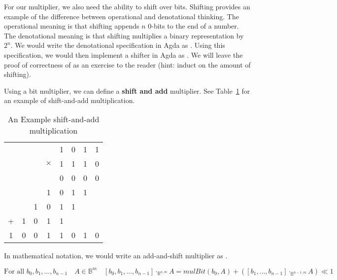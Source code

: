 \documentclass[14pt]{extarticle}  %
\begin{document}
For our multiplier, we also need the ability to shift over bits. Shifting provides an example of the difference between operational and
denotational thinking. The operational meaning is that shifting appends $n$ $0$-bits to the end of a number. The denotational meaning is that
shifting multiplies a binary representation by $2^{n}$. We would write the denotational specification in Agda as .
Using this specification, we would then implement a shifter in Agda as .
We will leave the proof of correctness of  as an exercise to the reader (hint: induct on the amount of shifting).

Using a bit multiplier, we can define a \textbf{shift and add} multiplier. See
Table~\ref{tab:mul} for an example of shift-and-add multiplication.

\begin{table}[!h]
  \begin{tabular}{c|c|c|c|c|c|c|c}
    &  & & & 1 & 0 & 1 & 1 \\
    &  & & $\times$ & 1 & 1 & 1 & 0 \\
    \hline

    &  & & & 0 & 0 & 0 & 0 \\
    &  & & 1 & 0 & 1 & 1 &  \\
     & & 1 & 0 & 1 & 1 & &   \\
      + & 1 & 0 & 1 & 1 &    \\
    \hline

      1 & 0 & 0 & 1 & 1 & 0 & 1 & 0    \\
\end{tabular}
\centering
\caption{An Example shift-and-add multiplication}
\label{tab:mul}
\end{table}

In mathematical notation, we would write an add-and-shift multiplier as .

\begin{equation}\label{equation:addnshift}
 \text{For all } b_{0},b_{1},\ldots,b_{n-1} \quad A \in \mathbb{B}^{m} \quad
  [b_{0},b_{1},\ldots,b_{n - 1}] \cdot_{\mathbb{B}^{n, m}} A = mulBit(b_{0}, A) +  ([b_{1}, \ldots, b_{n-1}] \cdot_{\mathbb{B}^{n-1, m}} A) \ll 1
\end{equation}
\end{document}
